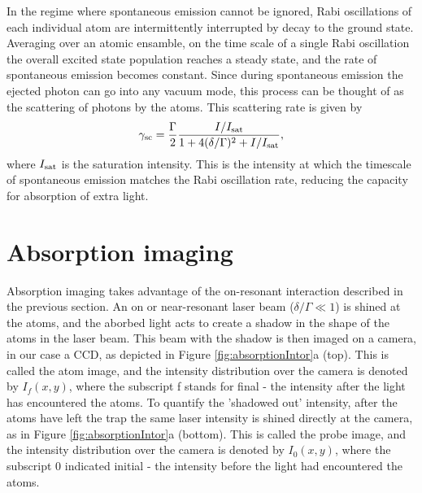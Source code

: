 In the regime where spontaneous emission cannot be ignored, Rabi oscillations of each individual atom are intermittently interrupted by decay to the ground state. Averaging over an atomic ensamble, on the time scale of a single Rabi oscillation the overall excited state population reaches a steady state, and the rate of spontaneous emission becomes constant. Since during spontaneous emission the ejected photon can go into any vacuum mode, this process can be thought of as the scattering of photons by the atoms. This scattering rate is given by\cite{LCT}
\begin{equation}
\gamma_{\rm{sc}}= \frac{\Gamma}{2} \frac{I/I_{\rm{sat}}}{1+4(\delta/\Gamma)^2 +I/I_{\rm{sat}}},
\label{eq:scatrate}
\end{equation}
where $I_{\rm{sat}}$ is the saturation intensity. This is the intensity at which the timescale of spontaneous emission matches the Rabi oscillation rate, reducing the capacity for absorption of extra light.   


\section{Absorption imaging}

Absorption imaging takes advantage of the on-resonant interaction described in the previous section. An on or near-resonant laser beam ($\delta/\Gamma\ll 1$) is shined at the atoms, and the aborbed light acts to create a shadow in the shape of the atoms in the laser beam. This beam with the shadow is then imaged on a camera, in our case a CCD, as depicted in Figure \ref{fig:absorptionIntor}a (top). This is called the atom image, and the intensity distribution over the camera is denoted by $I_f(x,y)$, where the subscript f stands for final - the intensity after the light has encountered the atoms. To quantify the 'shadowed out' intensity, after the atoms have left the trap the same laser intensity is shined directly at the camera, as in Figure \ref{fig:absorptionIntor}a (bottom).   This is called the probe image, and the intensity distribution over the camera is denoted by $I_0(x,y)$, where the subscript 0 indicated initial - the intensity before the light had encountered the atoms.



